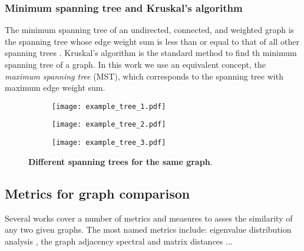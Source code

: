 \subsubsection{Minimum spanning tree and Kruskal's algorithm}
The minimum spanning tree of an undirected, connected, and weighted graph is the spanning tree whose edge weight sum is less than or equal to that of all other spanning trees \cite{Sefidgarminimumspanningtree}. Kruskal's algorithm \cite{Kershenbaum1972Computingminimumspanning} is the standard method to find th minimum spanning tree of a graph. In this work we use an equivalent concept, the \emph{maximum spanning tree} (MST), which corresponds to the spanning tree with maximum edge weight sum.
\begin{figure*}[!t]
	\centering	
	\hspace*{\fill}
	\begin{subfigure}[t]{0.32\textwidth}
		\subcaption{}
		\texttt{[image: example\_tree\_1.pdf]}
		\label{fig:example_tree_1}
	\end{subfigure}	
	\hfill
	\begin{subfigure}[t]{0.32\textwidth}
		\subcaption{}
		\texttt{[image: example\_tree\_2.pdf]}
		\label{fig:example_tree_2}
	\end{subfigure}
	\hfill
	\begin{subfigure}[t]{0.32\textwidth}
		\subcaption{}
		\texttt{[image: example\_tree\_3.pdf]}
		\label{fig:example_tree_3}
	\end{subfigure}	
	\hspace*{\fill}	
	\caption[] {\label{fig:tree_examples} \textbf{Different spanning trees for the same graph}.}
\end{figure*}



\subsection{Metrics for graph comparison}
\TODO

Several works cover a number of metrics and measures to asses the similarity of any two given graphs. The most named metrics include: eigenvalue distribution analysis \cite{Crawford2017GraphStructureSimilarity,Gera2018Identifyingnetworkstructure}, the graph adjacency spectral and matrix distances \cite{Wills2020Metricsgraphcomparison}$\ldots$

